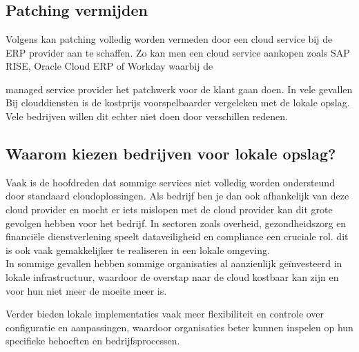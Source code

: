 
\chapter{}
\label{ch:corpus}

\section{Patching vermijden}

Volgens \textcite{Munck2024} kan patching volledig worden vermeden door een cloud service bij de ERP provider aan te schaffen. Zo kan men een cloud service aankopen zoals SAP RISE, Oracle Cloud ERP of Workday waarbij de 

managed service provider het patchwerk voor de klant gaan doen. In vele gevallen Bij clouddiensten is de kostprijs voorspelbaarder vergeleken met de lokale opslag. Vele bedrijven
 willen dit echter niet doen door verschillen redenen.\\


\section{Waarom kiezen bedrijven voor lokale opslag?}
Vaak is de hoofdreden dat sommige services niet volledig worden ondersteund door standaard cloudoplossingen. Als bedrijf ben je dan ook afhankelijk van deze cloud provider en mocht er iets mislopen met de cloud provider kan dit grote gevolgen hebben voor het bedrijf.
In sectoren zoals overheid, gezondheidszorg en financiële dienstverlening speelt dataveiligheid en compliance een cruciale rol. dit is ook vaak gemakkelijker te realiseren in een lokale omgeving.\\ 

In sommige gevallen hebben sommige organisaties al aanzienlijk geïnvesteerd in lokale infrastructuur, waardoor de overstap naar de cloud kostbaar kan zijn en voor hun niet meer de moeite meer is.

Verder bieden lokale implementaties vaak meer flexibiliteit en controle over configuratie en aanpassingen, waardoor organisaties beter kunnen inspelen op hun specifieke behoeften en 
bedrijfsprocessen.\\




